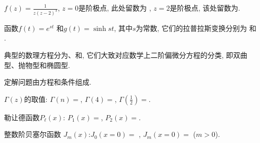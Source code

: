 \documentclass{njustexam}
\begin{document}
\begin{problem}
 $ f(z) = \frac{1}{z( z- 2)^3}$,  $z=0$是阶极点, 此处留数为 , 
 $z=2$是阶极点,  该处留数为. 
\end{problem}


\begin{problem}
函数$f(t) = e^{st}$ 和$g(t)=\sinh{st}$, 其中$s$为常数, 它们的拉普拉斯变换分别为 和
.
\end{problem}

\begin{problem}
  典型的数理方程分为、和, 
  它们大致对应数学上二阶偏微分方程的分类, 即双曲型、抛物型和椭圆型. 
  \end{problem}

\begin{problem}
  定解问题由方程和条件组成. %
\end{problem}

\begin{problem}
$\Gamma(z)$的取值: $\Gamma(n)=$,  
$\Gamma(4)=$, 
 $\Gamma(\frac{1}{2})= $\fillout{$\sqrt{\pi}$}.
\end{problem}

\begin{problem}
  勒让德函数$P_\ell(x)$:
  $P_1(x) = $,  $P_2(x) = $. 
  \end{problem}


\begin{problem}
整数阶贝塞尔函数 $J_m(x)$:$J_0(x=0)=$ , $ J_m (x=0)=$ ($m>0$).
\end{problem}
\end{document}
